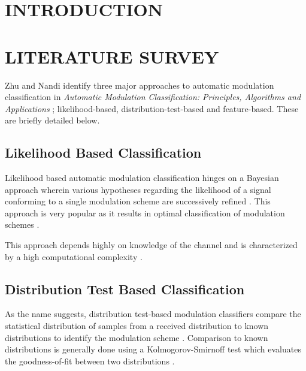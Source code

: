 \documentclass[10pt,onecolumn]{witseiepaper}
\begin{document}
\maketitle
\thispagestyle{empty}\pagestyle{empty}
\begin{multicols}{2}

\section{INTRODUCTION}

\section{LITERATURE SURVEY}
Zhu and Nandi identify three major approaches to automatic modulation classification in \textit{Automatic Modulation Classification: Principles, Algorithms and Applications} \cite{zhu2014automatic}; likelihood-based, distribution-test-based and feature-based. These are briefly detailed below.

	\subsection{Likelihood Based Classification}
	Likelihood based automatic modulation classification hinges on a Bayesian approach wherein various hypotheses regarding the likelihood of a signal conforming to a single modulation scheme are successively refined \cite{zhu2014automatic}. This approach is very popular as it results in optimal classification of modulation schemes \cite{zhu2014automatic}.

	This approach depends highly on knowledge of the channel and is characterized by a high computational complexity \cite{zhu2014automatic}. 

	\subsection{Distribution Test Based Classification}
	As the name suggests, distribution test-based modulation classifiers compare the statistical distribution of samples from a received distribution to known distributions to identify the modulation scheme \cite{zhu2014automatic}. Comparison to known distributions is generally done using a Kolmogorov-Smirnoff test which evaluates the goodness-of-fit between two distributions \cite{urriza2011computationally}.



\end{multicols}
\end{document}
